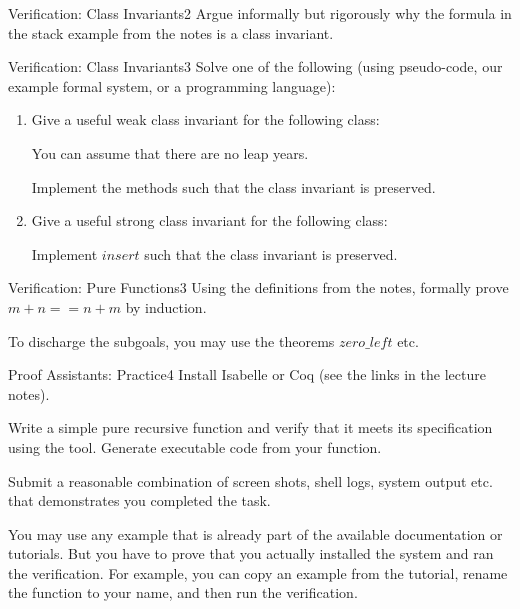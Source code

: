\documentclass[a4paper]{article}
\begin{document}
\header

\begin{problem}{Verification: Class Invariants}{2}
Argue informally but rigorously why the formula in the stack example from the notes is a class invariant.
\end{problem}

\begin{problem}{Verification: Class Invariants}{3}
Solve one of the following (using pseudo-code, our example formal system, or a programming language):

\begin{enumerate}
\item Give a useful weak class invariant for the following class:

\begin{acode}
\end{acode}
You can assume that there are no leap years.

Implement the methods such that the class invariant is preserved.

\item Give a useful strong class invariant for the following class:
\begin{acode}
\end{acode}

Implement $insert$ such that the class invariant is preserved.
\end{enumerate}
\end{problem}

\begin{problem}{Verification: Pure Functions}{3}
Using the definitions from the notes, formally prove $m+n==n+m$ by induction.

To discharge the subgoals, you may use the theorems $zero\_left$ etc.
\end{problem}

\begin{problem}{Proof Assistants: Practice}{4}
Install Isabelle or Coq (see the links in the lecture notes).

Write a simple pure recursive function and verify that it meets its specification using the tool.
Generate executable code from your function.
\medskip

Submit a reasonable combination of screen shots, shell logs, system output etc. that demonstrates you completed the task.

You may use any example that is already part of the available documentation or tutorials.
But you have to prove that you actually installed the system and ran the verification.
For example, you can copy an example from the tutorial, rename the function to your name, and then run the verification.
\end{problem}
\end{document}
